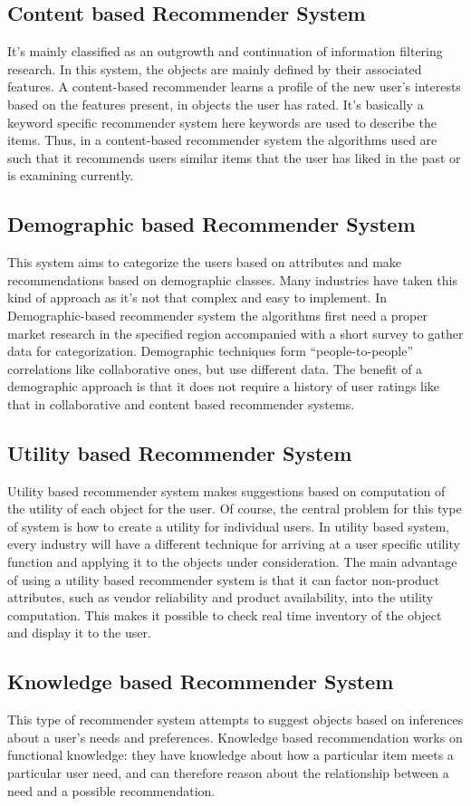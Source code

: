 \subsection{Content based Recommender System}
It’s mainly classified as an outgrowth and continuation of information filtering research. In this system, the objects are mainly defined by their associated features. A content-based recommender learns a profile of the new user’s interests based on the features present, in objects the user has rated. It’s basically a keyword specific recommender system here keywords are used to describe the items. Thus, in a content-based recommender system the algorithms used are such that it recommends users similar items that the user has liked in the past or is examining currently.
\subsection{Demographic based Recommender System}
This system aims to categorize the users based on attributes and make recommendations based on demographic classes. Many industries have taken this kind of approach as it’s not that complex and easy to implement. In Demographic-based recommender system the algorithms first need a proper market research in the specified region accompanied with a short survey to gather data for categorization. Demographic techniques form “people-to-people” correlations like collaborative ones, but use different data. The benefit of a demographic approach is that it does not require a history of user ratings like that in collaborative and content based recommender systems.
\subsection{Utility based Recommender System}
Utility based recommender system makes suggestions based on computation of the utility of each object for the user. Of course, the central problem for this type of system is how to create a utility for individual users. In utility based system, every industry will have a different technique for arriving at a user specific utility function and applying it to the objects under consideration. The main advantage of using a utility based recommender system is that it can factor non-product attributes, such as vendor reliability and product availability, into the utility computation. This makes it possible to check real time inventory of the object and display it to the user.
\subsection{Knowledge based Recommender System}
This type of recommender system attempts to suggest objects based on inferences about a user’s needs and preferences. Knowledge based recommendation works on functional knowledge: they have knowledge about how a particular item meets a particular user need, and can therefore reason about the relationship between a need and a possible recommendation.
